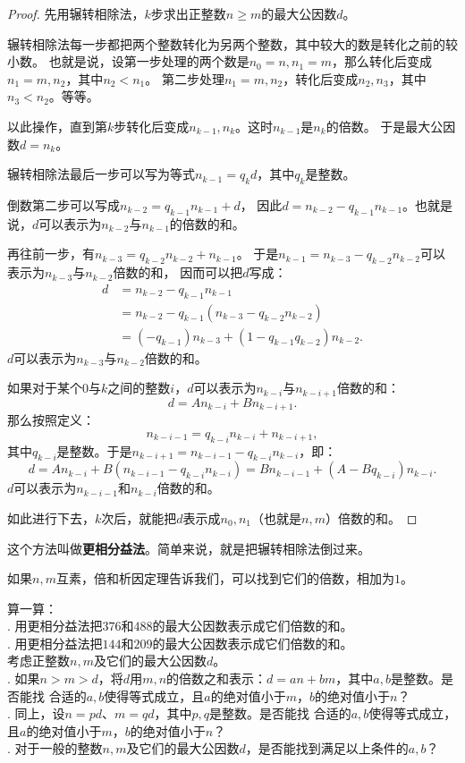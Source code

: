 \documentclass[12pt,UTF8,fontset=none]{ctexbook}
\begin{document}
\begin{proof}
    先用辗转相除法，$k$步求出正整数$n\geqslant m$的最大公因数$d$。

    辗转相除法每一步都把两个整数转化为另两个整数，其中较大的数是转化之前的较小数。
    也就是说，设第一步处理的两个数是$n_0=n,n_1=m$，那么转化后变成$n_1=m,n_2$，其中$n_2 < n_1$。
    第二步处理$n_1=m,n_2$，转化后变成$n_2,n_3$，其中$n_3 < n_2$。等等。
    
    以此操作，直到第$k$步转化后变成$n_{k-1}, n_k$。这时$n_{k-1}$是$n_k$的倍数。
    于是最大公因数$d = n_k$。

    辗转相除法最后一步可以写为等式$n_{k-1} = q_{k}d $，其中$q_{k}$是整数。

    倒数第二步可以写成$n_{k-2} = q_{k-1}n_{k-1} + d$，
    因此$d = n_{k-2} -q_{k-1}n_{k-1}$。也就是说，$d$可以表示为$n_{k-2}$与$n_{k-1}$的倍数的和。

    再往前一步，有$n_{k-3} = q_{k-2}n_{k-2} + n_{k-1}$。
    于是$n_{k-1} = n_{k-3} - q_{k-2}n_{k-2}$可以表示为$n_{k-3}$与$n_{k-2}$倍数的和，
    因而可以把$d$写成：
    \begin{align*}
        d &= n_{k-2} - q_{k-1}n_{k-1}  \\
          &= n_{k-2} - q_{k-1}(n_{k-3} - q_{k-2}n_{k-2})  \\ 
          &= (- q_{k-1})n_{k-3} + (1 - q_{k-1}q_{k-2})n_{k-2}. 
    \end{align*}
    $d$可以表示为$n_{k-3}$与$n_{k-2}$倍数的和。

    如果对于某个$0$与$k$之间的整数$i$，$d$可以表示为$n_{k-i}$与$n_{k-i+1}$倍数的和：
    $$ d = An_{k-i} + Bn_{k-i+1}. $$
    那么按照定义：
    $$n_{k-i-1} = q_{k-i}n_{k-i} + n_{k-i+1},$$
    其中$q_{k-i}$是整数。于是$n_{k-i+1} = n_{k-i-1} - q_{k-i}n_{k-i}$，即：
    $$ d = An_{k-i} + B(n_{k-i-1} - q_{k-i}n_{k-i}) = Bn_{k-i-1} + (A - Bq_{k-i})n_{k-i}.$$
    $d$可以表示为$n_{k-i-1}$和$n_{k-i}$倍数的和。

    如此进行下去，$k$次后，就能把$d$表示成$n_0,n_1$（也就是$n,m$）倍数的和。
\end{proof}

这个方法叫做\textbf{更相分益法}。简单来说，就是把辗转相除法倒过来。

如果$n,m$互素，倍和析因定理告诉我们，可以找到它们的倍数，相加为$1$。


\begin{xt}\label{xt:5-1-1}
    算一算：\\
    . 用更相分益法把$376$和$488$的最大公因数表示成它们倍数的和。\\
    . 用更相分益法把$144$和$209$的最大公因数表示成它们倍数的和。\\
    考虑正整数$n,m$及它们的最大公因数$d$。\\
    . 如果$n > m > d$，将$d$用$m,n$的倍数之和表示：$d = an + bm$，其中$a, b$是整数。是否能找
    合适的$a, b$使得等式成立，且$a$的绝对值小于$m$，$b$的绝对值小于$n$？\\
    . 同上，设$n = pd$、$m = qd$，其中$p, q$是整数。是否能找
    合适的$a, b$使得等式成立，且$a$的绝对值小于$m$，$b$的绝对值小于$n$？\\
    . 对于一般的整数$n,m$及它们的最大公因数$d$，是否能找到满足以上条件的$a, b$？
\end{xt}
\end{document}
